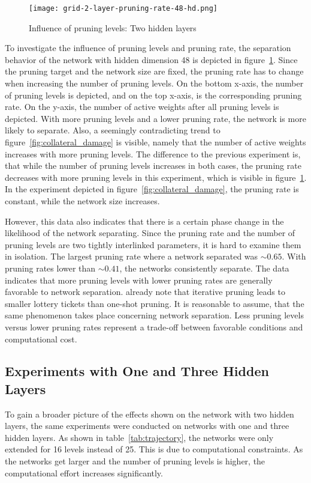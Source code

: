 \begin{figure}[ht]
    \centering
    \texttt{[image: grid-2-layer-pruning-rate-48-hd.png]}
    \caption{Influence of pruning levels: Two hidden layers
    }\label{fig:grid-2}
\end{figure}

To investigate the influence of pruning levels and pruning rate, the separation behavior of the network with hidden dimension 48 is depicted in figure~\ref{fig:grid-2}.
Since the pruning target and the network size are fixed, the pruning rate has to change when increasing the number of pruning levels.
On the bottom x-axis, the number of pruning levels is depicted, and on the top x-axis, is the corresponding pruning rate.
On the y-axis, the number of active weights after all pruning levels is depicted.
With more pruning levels and a lower pruning rate, the network is more likely to separate.
Also, a seemingly contradicting trend to figure~\ref{fig:collateral_damage} is visible, namely that the number of active weights increases with more pruning levels.
The difference to the previous experiment is, that while the number of pruning levels increases in both cases, the pruning rate decreases with more pruning levels in this experiment, which is visible in figure~\ref{fig:grid-2}. In the experiment depicted in figure~\ref{fig:collateral_damage}, the pruning rate is constant, while the network size increases.

However, this data also indicates that there is a certain phase change in the likelihood of the network separating.
Since the pruning rate and the number of pruning levels are two tightly interlinked parameters, it is hard to examine them in isolation.
The largest pruning rate where a network separated was $\sim0.65$. 
With pruning rates lower than $\sim0.41$, the networks consistently separate.
The data indicates that more pruning levels with lower pruning rates are generally favorable to network separation.
\textcite{LTH} already note that iterative pruning leads to smaller lottery tickets than one-shot pruning.
It is reasonable to assume, that the same phenomenon takes place concerning network separation.
Less pruning levels versus lower pruning rates represent a trade-off between favorable conditions and computational cost.

\subsection{Experiments with One and Three Hidden Layers}
To gain a broader picture of the effects shown on the network with two hidden layers, the same experiments were conducted on networks with one and three hidden layers.
As shown in table~\ref{tab:trajectory}, the networks were only extended for 16 levels instead of 25. 
This is due to computational constraints. As the networks get larger and the number of pruning levels is higher, the computational effort increases significantly.

